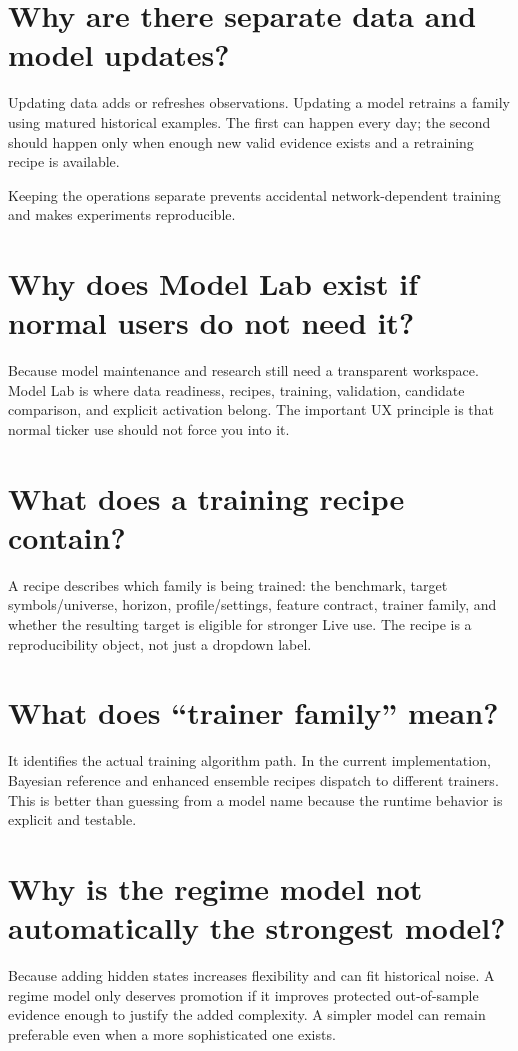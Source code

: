 \documentclass[11pt]{article}
\begin{document}
\section{Why are there separate data and model updates?}
Updating data adds or refreshes observations. Updating a model retrains a family using matured historical examples. The first can happen every day; the second should happen only when enough new valid evidence exists and a retraining recipe is available.

Keeping the operations separate prevents accidental network-dependent training and makes experiments reproducible.

\section{Why does Model Lab exist if normal users do not need it?}
Because model maintenance and research still need a transparent workspace. Model Lab is where data readiness, recipes, training, validation, candidate comparison, and explicit activation belong. The important UX principle is that normal ticker use should not force you into it.

\section{What does a training recipe contain?}
A recipe describes which family is being trained: the benchmark, target symbols/universe, horizon, profile/settings, feature contract, trainer family, and whether the resulting target is eligible for stronger Live use. The recipe is a reproducibility object, not just a dropdown label.

\section{What does ``trainer family'' mean?}
It identifies the actual training algorithm path. In the current implementation, Bayesian reference and enhanced ensemble recipes dispatch to different trainers. This is better than guessing from a model name because the runtime behavior is explicit and testable.

\section{Why is the regime model not automatically the strongest model?}
Because adding hidden states increases flexibility and can fit historical noise. A regime model only deserves promotion if it improves protected out-of-sample evidence enough to justify the added complexity. A simpler model can remain preferable even when a more sophisticated one exists.
\end{document}
